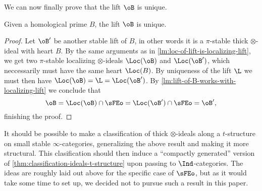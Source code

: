We can now finally prove that the lift $\oB$ is unique. 

\begin{theorem}
    \label{thm:uniqueness-of-lift}
    Given a homological prime $B$, the lift $\oB$ is unique. 
\end{theorem}
\begin{proof}
    Let $\oB'$ be another stable lift of $B$, in other words it is a $\pi$-stable thick $\otimes$-ideal with heart $B$. By the same arguments as in \cref{lm:loc-of-lift-is-localizing-lift}, we get two $\pi$-stable localizing $\otimes$-ideals $\Loc(\oB)$ and $\Loc(\oB')$, which neccessarily must have the same heart $\Loc(B)$. By uniqueness of the lift $\L$ we must then have $\Loc(\oB) = \L = \Loc(\oB')$. By \cref{lm:lift-of-B-works-with-localizing-lift} we conclude that 
    \[\oB = \Loc(\oB)\cap \sFEo = \Loc(\oB')\cap \sFEo = \oB',\]
    finishing the proof. 
\end{proof}

\begin{remark}
    It should be possible to make a classification of thick $\otimes$-ideals along a $t$-structure on small stable $\infty$-categories, generalizing the above result and making it more structural. This clasification should then induce a ``compactly generated'' version of \cref{thm:classification-ideals-t-structure} upon passing to $\Ind$-categories. The ideas are roughly laid out above for the specific case of $\sFEo$, but as it would take some time to set up, we decided not to pursue such a result in this paper. 
\end{remark}


